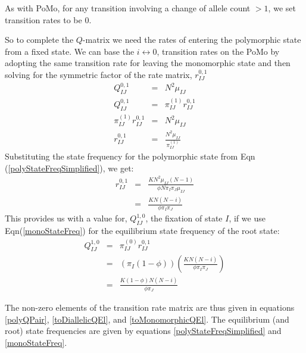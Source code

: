 \documentclass{llncs}
\newcommand{\polyProb}{\ensuremath{\phi}}}
\newcommand{\Knorm}{\ensuremath{K}}}
\newcommand{\pomo}{PoMo\xspace}
\begin{document}
As with \pomo, for any transition involving a change of allele count $>1$, we set transition rates to be 0.

So to complete the $Q$-matrix we need the rates of entering the polymorphic state from a fixed state.
We can base the $i\leftrightarrow 0$, transition rates on the \pomo by adopting 
    the same transition rate for leaving the monomorphic state and
    then solving for the symmetric factor of the rate matrix, $r_{IJ}^{0,1}$
\begin{eqnarray}
    Q_{IJ}^{0,1} & = & N^2 \mu_{IJ}  \label{toDiallelicQEl}\\
    Q_{IJ}^{0,1} & = & \pi_{IJ}^{(1)} r_{IJ}^{0,1} \nonumber\\
    \pi_{IJ}^{(1)} r_{IJ}^{0,1}& = & N^2 \mu_{IJ}  \nonumber \\
    r_{IJ}^{0,1}& = & \frac{N^2 \mu_{IJ}}{\pi_{IJ}^{(1)}}
\end{eqnarray}
Substituting the state frequency for the polymorphic state from Eqn (\ref{polyStateFreqSimplified}), we get:
\begin{eqnarray}
    r_{IJ}^{0,1} & = & \frac{\Knorm N^2 \mu_{IJ}(N-1)}{\polyProb N\pi_I\pi_J\mu_{IJ}} \nonumber \\
                 & = & \frac{\Knorm N(N-i)}{\polyProb \pi_I\pi_J} 
\end{eqnarray}
This provides us with a value for, $Q_{IJ}^{1,0}$, the fixation of state $I$, if we use Eqn(\ref{monoStateFreq}) for the equilibrium state frequency of the root state:
\begin{eqnarray}
    Q_{IJ}^{1,0} & = & \pi_{IJ}^{(0)} r_{IJ}^{0,1} \nonumber \\
                 & = & \left(\pi_I(1-\polyProb)\right)\left(\frac{\Knorm N(N-i)}{\polyProb \pi_I\pi_J} \right) \nonumber \\
                 & = & \frac{\Knorm (1-\polyProb)N(N-i)}{\polyProb \pi_J} \label{toMonomorphicQEl}
\end{eqnarray}

The non-zero elements of the transition rate matrix are thus given in equations \ref{polyQPair}, \ref{toDiallelicQEl}, and \ref{toMonomorphicQEl}.
The equilibrium (and root) state frequencies are given by equations \ref{polyStateFreqSimplified} and \ref{monoStateFreq}.
\end{document}
